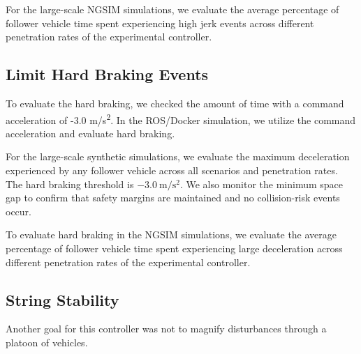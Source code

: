 \documentclass[conference]{IEEEtran}
\begin{document}
For the large-scale NGSIM simulations, we evaluate the average percentage of follower vehicle time spent experiencing high jerk events across different penetration rates of the experimental controller.

\subsection{Limit Hard Braking Events}

To evaluate the hard braking, we checked the amount of time with a command acceleration of -3.0 m/s\textsuperscript{2}. 
In the ROS/Docker simulation, we utilize the command acceleration and evaluate hard braking.

For the large-scale synthetic simulations, we evaluate the maximum deceleration experienced by any follower vehicle across all scenarios and penetration rates. The hard braking threshold is $-3.0~\mathrm{m/s^2}$. We also monitor the minimum space gap to confirm that safety margins are maintained and no collision-risk events occur.

To evaluate hard braking in the NGSIM simulations, we evaluate the average percentage of follower vehicle time spent experiencing large deceleration across different penetration rates of the experimental controller.

\subsection{String Stability}

Another goal for this controller was not to magnify disturbances through a platoon of vehicles. 
\end{document}
